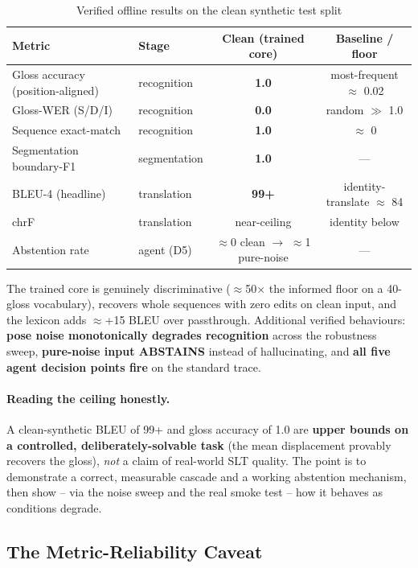 \documentclass[12pt,a4paper]{article}
\begin{document}
\begin{table}[H]
\centering
\caption{Verified offline results on the clean synthetic test split}
\small
\begin{tabular}{llcc}
\toprule
\textbf{Metric} & \textbf{Stage} & \textbf{Clean (trained core)} & \textbf{Baseline / floor} \\
\midrule
Gloss accuracy (position-aligned) & recognition & \textbf{1.0} & most-frequent $\approx$ 0.02 \\
Gloss-WER (S/D/I) & recognition & \textbf{0.0} & random $\gg$ 1.0 \\
Sequence exact-match & recognition & \textbf{1.0} & $\approx$ 0 \\
Segmentation boundary-F1 & segmentation & \textbf{1.0} & --- \\
BLEU-4 (headline) & translation & \textbf{99+} & identity-translate $\approx$ 84 \\
chrF & translation & near-ceiling & identity below \\
Abstention rate & agent (D5) & $\approx$0 clean $\rightarrow$ $\approx$1 pure-noise & --- \\
\bottomrule
\end{tabular}
\end{table}

The trained core is genuinely discriminative ($\approx$50$\times$ the informed floor on a 40-gloss vocabulary), recovers whole sequences with zero edits on clean input, and the lexicon adds $\approx$+15 BLEU over passthrough. Additional verified behaviours: \textbf{pose noise monotonically degrades recognition} across the robustness sweep, \textbf{pure-noise input ABSTAINS} instead of hallucinating, and \textbf{all five agent decision points fire} on the standard trace.

\paragraph{Reading the ceiling honestly.} A clean-synthetic BLEU of 99+ and gloss accuracy of 1.0 are \textbf{upper bounds on a controlled, deliberately-solvable task} (the mean displacement provably recovers the gloss), \emph{not} a claim of real-world SLT quality. The point is to demonstrate a correct, measurable cascade and a working abstention mechanism, then show -- via the noise sweep and the real smoke test -- how it behaves as conditions degrade.

\subsection{The Metric-Reliability Caveat}
\end{document}
